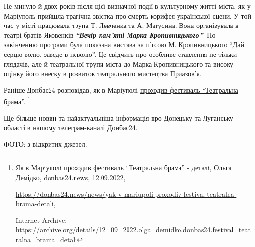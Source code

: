 Не минуло й двох років після цієї визначної події в культурному житті міста, як
у Маріуполь прийшла трагічна звістка про смерть корифея української сцени. У
той час у місті працювала трупа Т. Левченка та А. Матусина. Вона організувала в
театрі братів Яковенків \textbf{\emph{\enquote{Вечір пам'яті Марка Кропивницького}}}. По закінченню
програми була показана вистава за п'єсою М. Кропивницького \enquote{Дай серцю волю,
заведе в неволю}. Це свідчить про особливе ставлення не тільки глядачів, але й
театральної трупи міста до Марка Кропивницького та високу оцінку його внеску в
розвиток театрального мистецтва Приазов'я.

Раніше Донбас24 розповідав, як в Маріуполі
\href{https://archive.org/details/12_09_2022.olga_demidko.donbas24.festival_teatralna_brama_detali}{проходив
фестиваль \enquote{Театральна брама}}.%
\footnote{Як в Марiуполi проходив фестиваль \enquote{Театральна брама} - деталi, Ольга Демідко, donbas24.news, 12.09.2022, \par%
\url{https://donbas24.news/news/yak-v-mariupoli-proxodiv-festival-teatralna-brama-detali}, \par%
Internet Archive: \url{https://archive.org/details/12_09_2022.olga_demidko.donbas24.festival_teatralna_brama_detali}%
}

Ще більше новин та найактуальніша інформація про Донецьку та Луганську області
в нашому \href{https://t.me/donbas24}{телеграм-каналі Донбас24}.

ФОТО: з відкритих джерел.

